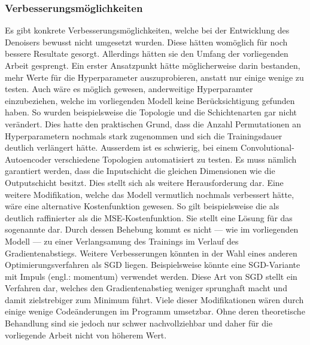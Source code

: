 \subsubsection{Verbesserungsmöglichkeiten}
Es gibt konkrete Verbesserungsmöglichkeiten, welche bei der Entwicklung
des Denoisers bewusst nicht umgesetzt wurden.
Diese hätten womöglich für noch bessere Resultate gesorgt. Allerdings hätten
sie den Umfang der vorliegenden Arbeit gesprengt.
\para{}
Ein erster Ansatzpunkt hätte möglicherweise darin bestanden, mehr Werte für die
Hyperparameter auszuprobieren, anstatt nur einige wenige zu testen.
\para{}
Auch wäre es möglich gewesen, anderweitige
Hyperparamter einzubeziehen, welche im vorliegenden Modell keine
Berücksichtigung gefunden haben. So wurden beispielsweise die Topologie und die
Schichtenarten gar nicht verändert. Dies hatte den
praktischen Grund, dass die Anzahl Permutationen an Hyperparametern nochmals
stark zugenommen und sich die Trainingsdauer deutlich verlängert hätte.
Ausserdem ist es schwierig, bei einem Convolutional-Autoencoder verschiedene
Topologien automatisiert zu testen. Es muss nämlich garantiert werden, dass die
Inputschicht die gleichen Dimensionen wie die Outputschicht besitzt. Dies stellt
sich als weitere Herausforderung dar.
\para{}
Eine weitere Modifikation, welche das Modell vermutlich nochmals verbessert hätte,
wäre eine alternative Kostenfunktion gewesen. So gilt beispielsweise die
 als deutlich raffinierter als die MSE-Kostenfunktion.
Sie stellt eine Lösung für das sogenannte 
dar. Durch dessen Behebung kommt es nicht --- wie im vorliegenden Modell --- zu einer Verlangsamung des Trainings im
Verlauf des Gradientenabstiegs.
\para{}
Weitere Verbesserungen könnten in der Wahl eines anderen
Optimierungsverfahren als SGD liegen. Beispielsweise könnte eine SGD-Variante mit
Impuls (engl.: momentum) verwendet werden. Diese Art von SGD stellt ein
Verfahren dar, welches den Gradientenabstieg weniger sprunghaft macht und damit
zielstrebiger zum Minimum führt.
\para{}
Viele dieser Modifikationen wären durch einige wenige Codeänderungen im Programm
umsetzbar. Ohne deren theoretische Behandlung sind sie jedoch nur schwer
nachvollziehbar und daher für die vorliegende Arbeit nicht von höherem Wert.



